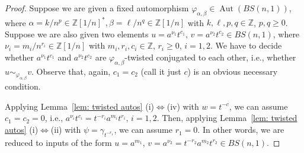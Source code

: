 \documentclass[10pt,a4paper]{amsart}
\newcommand\ZZ{\mathbb{Z}}
\newcommand{\Aut}{\operatorname{Aut}}
\begin{document}
\begin{proof}
Suppose we are given a fixed automorphism $\varphi_{\alpha, \beta}\in \Aut(BS(n,1))$, 
where $\alpha=k/n^p \in \ZZ[1/n]^*, \beta=\ell/n^q\in \ZZ[1/n]$ with $k,\ell, p,q\in \ZZ$, $p,q\geq 0$. Suppose we are also given two elements $u=a^{\nu_1}t^{c_1},\, v=a^{\nu_2}t^{c_2}\in BS(n,1)$, where $\nu_i =m_i/n^{r_i}\in \ZZ[1/n]$ with $m_i, r_i, c_i\in \ZZ$, $r_i\geq 0$, $i=1,2$. We have to decide whether $a^{\nu_1}t^{c_1}$ and $a^{\nu_2}t^{c_2}$ are $\varphi_{\alpha, \beta}$-twisted conjugated to each other, i.e., whether $u\sim_{\varphi_{\alpha, \beta}} v$. Observe that, again, $c_1=c_2$ (call it just $c$) is an obvious necessary condition. 

Applying Lemma~\ref{lem: twisted autos} (i)$\Leftrightarrow$(iv) with $w=t^{-c}$, we can assume $c_1=c_2=0$, i.e., $a^{\nu_i}t^{c_i}=t^{-r_i}a^{m_i}t^{r_i}$, $i=1,2$. Then, applying Lemma~\ref{lem: twisted autos} (i)$\Leftrightarrow$(ii) with $\psi=\gamma_{t^{-r_1}}$, we can assume $r_1=0$. In other words, we are reduced to inputs of the form $u=a^{m_1},\, v=a^{\nu_2}=t^{-r_2}a^{m_2}t^{r_2}\in BS(n,1)$.


\end{proof}
\end{document}
